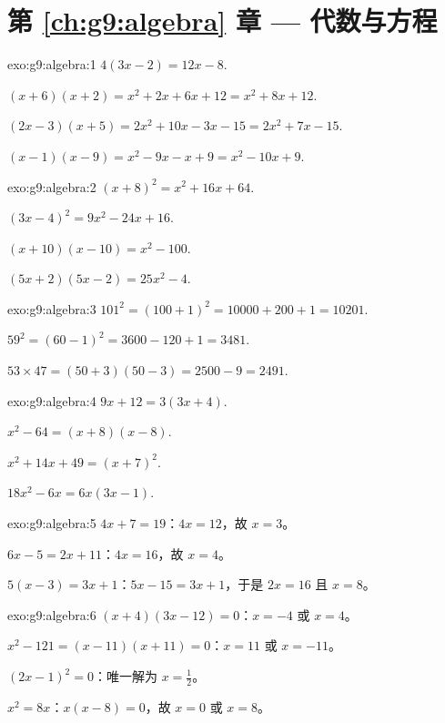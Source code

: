 \section*{第 \ref{ch:g9:algebra} 章 --- 代数与方程}

\begin{solution}{exo:g9:algebra:1}
$4(3x - 2) = 12x - 8$.

$(x+6)(x+2) = x^2 + 2x + 6x + 12 = x^2 + 8x + 12$.

$(2x-3)(x+5) = 2x^2 + 10x - 3x - 15 = 2x^2 + 7x - 15$.

$(x-1)(x-9) = x^2 - 9x - x + 9 = x^2 - 10x + 9$.
\end{solution}

\begin{solution}{exo:g9:algebra:2}
$(x+8)^2 = x^2 + 16x + 64$.

$(3x-4)^2 = 9x^2 - 24x + 16$.

$(x+10)(x-10) = x^2 - 100$.

$(5x+2)(5x-2) = 25x^2 - 4$.
\end{solution}

\begin{solution}{exo:g9:algebra:3}
$101^2 = (100+1)^2 = 10000 + 200 + 1 = 10201$.

$59^2 = (60-1)^2 = 3600 - 120 + 1 = 3481$.

$53 \times 47 = (50+3)(50-3) = 2500 - 9 = 2491$.
\end{solution}

\begin{solution}{exo:g9:algebra:4}
$9x + 12 = 3(3x + 4)$.

$x^2 - 64 = (x+8)(x-8)$.

$x^2 + 14x + 49 = (x+7)^2$.

$18x^2 - 6x = 6x(3x - 1)$.
\end{solution}

\begin{solution}{exo:g9:algebra:5}
$4x + 7 = 19$：$4x = 12$，故 $x = 3$。

$6x - 5 = 2x + 11$：$4x = 16$，故 $x = 4$。

$5(x-3) = 3x + 1$：$5x - 15 = 3x + 1$，于是 $2x = 16$ 且 $x = 8$。
\end{solution}

\begin{solution}{exo:g9:algebra:6}
$(x+4)(3x-12) = 0$：$x = -4$ 或 $x = 4$。

$x^2 - 121 = (x-11)(x+11) = 0$：$x = 11$ 或 $x = -11$。

$(2x-1)^2 = 0$：唯一解为 $x = \frac12$。

$x^2 = 8x$：$x(x - 8) = 0$，故 $x = 0$ 或 $x = 8$。
\end{solution}


